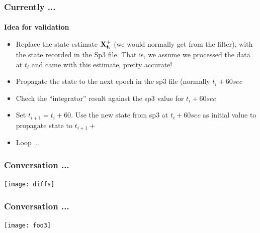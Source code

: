 \documentclass{beamer}
\newcommand{\bitem}{\item[\textbullet]}
\begin{document}
\begin{frame}\frametitle{Currently ...}\framesubtitle{}
  \textbf{Idea for validation}
  \medskip

  \begin{itemize}
    \bitem Replace the state estimate $\bf{X}_{t_i}^+$ (we would normally get from 
  the filter), with the state recorded in the Sp3 file. That is, we assume 
  we processed the data at $t_i$ and came with this estimate, pretty accurate!

    \bitem Propagate the state to the next epoch in the sp3 file (normally $t_i + 60sec$

    \bitem Check the ``integrator'' result against the sp3 value for $t_i + 60sec$

    \bitem Set $t_{i+1}=t_i + 60$. Use the new state from sp3 at $t_i + 60sec$ as 
  initial value to propagate state to $t_{i+1}+$

    \bitem Loop ...
  \end{itemize}

\end{frame}

\begin{frame}\frametitle{Conversation ...}\framesubtitle{}
\centering
    \texttt{[image: diffs]}
\end{frame}

\begin{frame}\frametitle{Conversation ...}\framesubtitle{}
\centering
    \texttt{[image: foo3]}
\end{frame}


\end{document}
